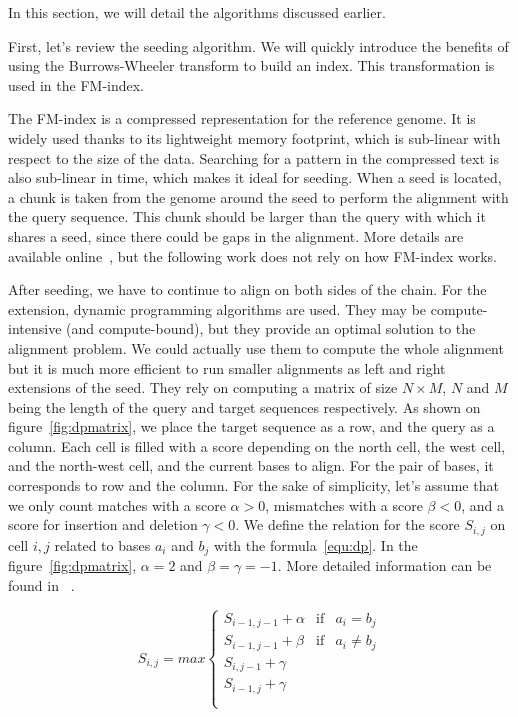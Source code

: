 In this section, we will detail the algorithms discussed earlier.

First, let's review the seeding algorithm. We will quickly introduce the benefits of using the Burrows-Wheeler transform to build an index. This transformation is used in the FM-index.

The FM-index is a compressed representation for the reference genome. It is widely used thanks to its lightweight memory footprint, which is sub-linear with respect to the size of the data. Searching for a pattern in the compressed text is also sub-linear in time, which makes it ideal for seeding. When a seed is located, a chunk is taken from the genome around the seed to perform the alignment with the query sequence. This chunk should be larger than the query with which it shares a seed, since there could be gaps in the alignment. More details are available online~\cite{wiki:FMIndex}, but the following work does not rely on how FM-index works. 

After seeding, we have to continue to align on both sides of the chain. For the extension, dynamic programming algorithms are used. They may be compute-intensive (and compute-bound), but they provide an optimal solution to the alignment problem. We could actually use them to compute the whole alignment but it is much more efficient to run smaller alignments as left and right extensions of the seed. They rely on computing a matrix of size $N \times M$, $N$ and $M$ being the length of the query and target sequences respectively. As shown on figure~\ref{fig:dpmatrix}, we place the target sequence as a row, and the query as a column. Each cell is filled with a score depending on the north cell, the west cell, and the north-west cell, and the current bases to align. For the pair of bases, it corresponds to row and the column. For the sake of simplicity, let's assume that we only count matches with a score $\alpha > 0$, mismatches with a score $\beta < 0$, and a score for insertion and deletion $\gamma < 0$. We define the relation for the score $S_{i,j}$ on cell $i,j$ related to bases $a_i$ and $b_j$ with the formula~\ref{equ:dp}. In the figure~\ref{fig:dpmatrix}, $\alpha = 2$ and $\beta = \gamma = -1$. More detailed information can be found in ~\cite{Aluru:2005:HCM:1121650}.

\begin{equation}
	S_{i,j} = max \left\{
	\begin{array}{llll}
		S_{i-1, j-1} + \alpha & \mbox{if} & a_i = b_j \\
		S_{i-1, j-1} + \beta & \mbox{if} & a_i \neq b_j \\
		S_{i, j-1} + \gamma \\
		S_{i-1, j} + \gamma\\
		 \\
	\end{array}
	\right.
	\label{equ:dp}
\end{equation}



